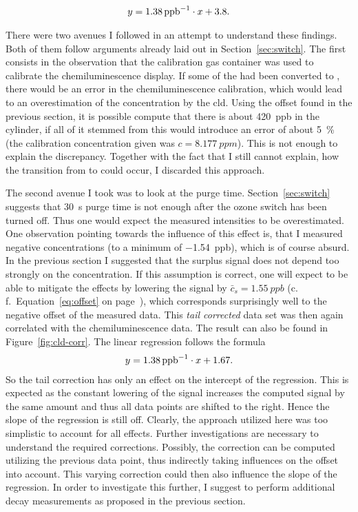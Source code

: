 \begin{align*}
  y = \SI{1.38}{{ppb}\tothe{-1}} \cdot x + 3.8.
\end{align*}

There were two avenues I followed in an attempt to understand these
findings. Both of them follow arguments already laid out in
Section~\ref{sec:switch}. The first consists in the observation that
the  calibration gas container was used to calibrate the
chemiluminescence display. If some of the  had been converted
to , there would be an error in the chemiluminescence
calibration, which would lead to an overestimation of the 
concentration by the cld. Using the  offset found in the
previous section, it is possible compute that there is about
\SI{420}{ppb}  in the cylinder, if all of it stemmed from
 this would introduce an error of about \SI{5}{\percent} (the
calibration concentration given was $c = \SI{8.177}{ppm}$). This is
not enough to explain the discrepancy. Together with the fact that I
still cannot explain, how the transition from  to 
could occur, I discarded this approach.

The second avenue I took was to look at the purge time.
Section~\ref{sec:switch} suggests that \SI{30}{\second} purge time is
not enough after the ozone switch has been turned off. Thus one would
expect the measured  intensities to be overestimated. One
observation pointing towards the influence of this effect is, that I
measured negative  concentrations (to a minimum of
\SI{-1.54}{ppb}), which is of course absurd. In the previous section I
suggested that the surplus  signal does not depend too strongly
on the  concentration. If this assumption is correct, one will
expect to be able to mitigate the effects by lowering the 
signal by $\bar c_s = \SI{1.55}{ppb}$ (c.\,f.\
Equation~\eqref{eq:offset} on page~\pageref{eq:offset}), which
corresponds surprisingly well to the negative offset of the measured
data. This \emph{tail corrected} data set was then again correlated
with the chemiluminescence data. The result can also be found in
Figure~\ref{fig:cld-corr}. The linear regression follows the formula
\begin{align*}
  y = \SI{1.38}{ppb\tothe{-1}} \cdot x + 1.67.
\end{align*}
So the tail correction has only an effect on the intercept of the
regression. This is expected as the constant lowering of the 
signal increases the computed \ch{NO} signal by the same amount and
thus all data points are shifted to the right. Hence the slope of the
regression is still off. Clearly, the approach utilized here was too
simplistic to account for all effects. Further investigations are
necessary to understand the required corrections. Possibly, the
 correction can be computed utilizing the previous 
data point, thus indirectly taking \ch{NO} influences on the offset
into account. This varying \ch{NO2} correction could then also
influence the slope of the regression. In order to investigate this
further, I suggest to perform additional decay measurements as
proposed in the previous section.

